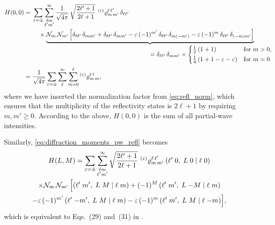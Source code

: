 \begin{align}
  H(0, 0)
  ={}& \begin{multlined}[t]
    \sum_{\refl = \pm} \sum_{\substack{\ell m \\ \ell' m'}}^\infty
    \frac{1}{\sqrt{4 \pi}}\, \sqrt{\frac{2 \ell' + 1}{2 \ell + 1}}\,
      \prescript{(\refl)}{}{\varrho}^{\ell\, \ell'}_{m\, m'}\, \delta_{\ell \ell'} \\
      \times \rdUnderbrace{\mathcal{N}_m\, \mathcal{N}_{m'} \sBrk[2]{%
        \delta_{\ell \ell'}\, \delta_{m m'}
        + \delta_{\ell \ell'}\, \delta_{m m'}
        - \refl\, (-1)^{m'}\, \delta_{\ell \ell'}\, \delta_{m (-m')}
        - \refl\, (-1)^m\, \delta_{\ell \ell'}\, \delta_{(-m) m'}}}%
        {= \delta_{\ell \ell'}\, \delta_{m m'} \times
        \begin{cases*}
          \frac{1}{2}\, (1 + 1)                 & for $m > 0$, \\
          \frac{1}{4}\, (1 + 1 - \refl - \refl) & for $m = 0$
        \end{cases*}}
  \end{multlined} \notag
  \\
  ={}& \frac{1}{\sqrt{4 \pi}} \sum_{\refl = \pm} \sum_\ell^\infty \sum_{m = 0}^\ell \prescript{(\refl)}{}{\varrho}^{\ell\, \ell}_{m\, m},
\end{align}
where we have inserted the normalization factor from
\cref{eq:refl_norm}, which ensures that the multiplicity of the
reflectivity states is $2 \ell + 1$ by requiring $m, m' \geq 0$.
According to the above, $H(0, 0)$ is the sum of all partial-wave
intensities.


Similarly, \cref{eq:diffraction_moments_pw_refl} becomes
\begin{multline}
  \label{eq:diffraction_moments_pw_refl_norm}
  H(L, M)
  = \sum_{\varepsilon = \pm} \sum_{\substack{\ell m \\ \ell' m'}}^\infty
    \sqrt{\frac{2 \ell' + 1}{2 \ell + 1}}\,
    \prescript{(\ensuremath{\varepsilon})}{}{\varrho}^{\ell\, \ell'}_{m\, m'}\, ({\ell'}\;{0},\;{L}\;{0}\; |\; {\ell}\;{0}) \\
    \times \mathcal{N}_m\, \mathcal{N}_{m'}\, \Big[
      ({\ell'}\;{m'},\;{L}\;{M}\; |\; {\ell}\;{m})
      + (-1)^M\, ({\ell'}\;{m'},\;{L}\;{-M}\; |\; {\ell}\;{m}) \\
      - \varepsilon\, (-1)^{m'}\, ({\ell'}\;{-m'},\;{L}\;{M}\; |\; {\ell}\;{m})
      - \varepsilon\, (-1)^m\, ({\ell'}\;{m'},\;{L}\;{M}\; |\; {\ell}\;{-m}) \Big],
\end{multline}
which is equivalent to Eqs.~(29) and~(31) in .


